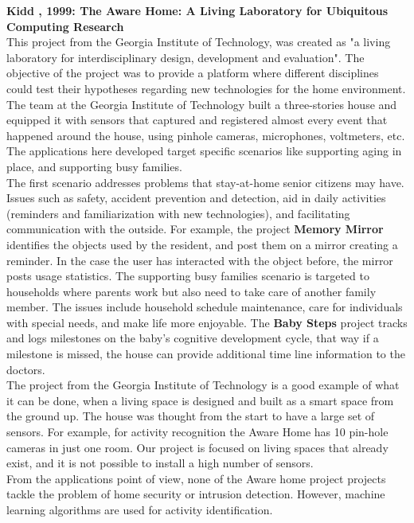 \textbf{Kidd \etAl, 1999: The Aware Home: A Living Laboratory for Ubiquitous Computing Research} \cite{raey} \\
This project from the Georgia Institute of Technology, was created as "a living laboratory for interdisciplinary design, development and evaluation"\cite{Kientz:2008:GTA:1358628.1358911}. The objective of the project was to provide a platform where different disciplines could test their hypotheses regarding new technologies for the home environment. The team at the Georgia Institute of Technology built a three-stories house and equipped it with sensors that captured and registered almost every event that happened around the house, using pinhole cameras, microphones, voltmeters, etc. The applications here developed target specific scenarios like supporting aging in place, and supporting busy families. \\
The first scenario addresses problems that stay-at-home senior citizens may have. Issues such as safety, accident prevention and detection, aid in daily activities (reminders and familiarization with new technologies), and facilitating communication with the outside. For example, the project \textbf{Memory Mirror}\cite{Kientz:2008:GTA:1358628.1358911} identifies the objects used by the resident, and post them on a mirror creating a reminder. In the case the user has interacted with the object before, the mirror posts usage statistics.
The supporting busy families scenario is targeted to households where parents work but also need to take care of another family member. The issues include household schedule maintenance, care for individuals with special needs, and make life more enjoyable. The \textbf{Baby Steps} \cite{Kientz:2007:GKU:1240624.1240830} project tracks and logs milestones on the baby's cognitive development cycle, that way if a milestone is missed, the house can provide additional time line information to the doctors.\\
The project from the Georgia Institute of Technology is a good example of what it can be done, when a living space is designed and built as a smart space from the ground up. The house was thought from the start to have a large set of sensors. For example, for activity recognition the Aware Home has 10 pin-hole cameras in just one room\cite{Kientz:2008:GTA:1358628.1358911}. Our project is focused on living spaces that already exist, and it is not possible to install a high number of sensors.\\
From the applications point of view, none of the Aware home project projects tackle the problem of home security or intrusion detection. However, machine learning algorithms are used for activity identification.\\

